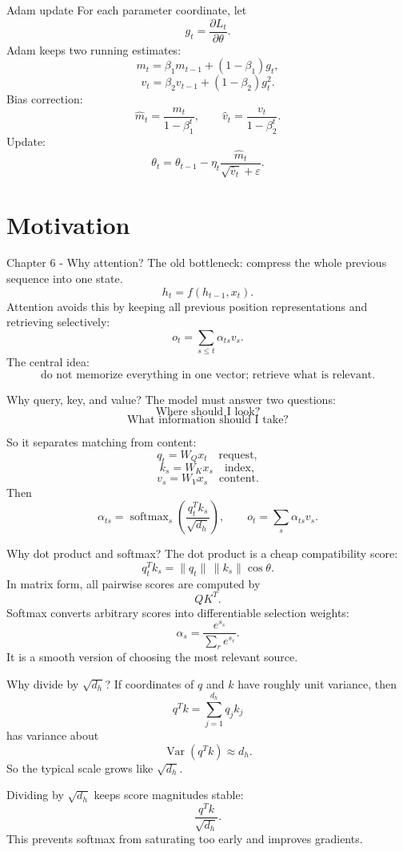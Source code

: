\documentclass[
  xcolor={svgnames,dvipsnames},
  hyperref={pagebackref,bookmarks},
  aspectratio=169,
  11pt
]{beamer}
\begin{document}
\begin{frame}{Adam update}
For each parameter coordinate, let
\[
g_t=\frac{\partial L_t}{\partial\theta}.
\]
Adam keeps two running estimates:
\[
m_t=\beta_1m_{t-1}+(1-\beta_1)g_t,
\]
\[
v_t=\beta_2v_{t-1}+(1-\beta_2)g_t^2.
\]
Bias correction:
\[
\hat m_t=\frac{m_t}{1-\beta_1^t},\qquad
\hat v_t=\frac{v_t}{1-\beta_2^t}.
\]
Update:
\[
\theta_t=\theta_{t-1}-\eta_t\frac{\hat m_t}{\sqrt{\hat v_t}+\varepsilon}.
\]
\end{frame}

\section{Motivation}
\begin{frame}{Chapter 6 - Why attention?}
The old bottleneck: compress the whole previous sequence into one state.
\[
h_t=f(h_{t-1},x_t).
\]
Attention avoids this by keeping all previous position representations and retrieving selectively:
\[
o_t=\sum_{s\le t}\alpha_{ts}v_s.
\]
The central idea:
\[
\boxed{\text{do not memorize everything in one vector; retrieve what is relevant.}}
\]
\end{frame}

\begin{frame}{Why query, key, and value?}
The model must answer two questions:
\[
\text{Where should I look?}
\]
\[
\text{What information should I take?}
\]

So it separates matching from content:
\[
q_t=W_Qx_t\quad\text{request},
\]
\[
k_s=W_Kx_s\quad\text{index},
\]
\[
v_s=W_Vx_s\quad\text{content}.
\]
Then
\[
\alpha_{ts}=\operatorname{softmax}_s\left(\frac{q_t^Tk_s}{\sqrt{d_h}}\right),
\qquad
 o_t=\sum_s\alpha_{ts}v_s.
\]
\end{frame}

\begin{frame}{Why dot product and softmax?}
The dot product is a cheap compatibility score:
\[
q_t^Tk_s=\|q_t\|\,\|k_s\|\cos\theta.
\]
In matrix form, all pairwise scores are computed by
\[
QK^T.
\]
Softmax converts arbitrary scores into differentiable selection weights:
\[
\alpha_s=\frac{e^{s_s}}{\sum_r e^{s_r}}.
\]
It is a smooth version of choosing the most relevant source.
\end{frame}

\begin{frame}{Why divide by $\sqrt{d_h}$?}
If coordinates of $q$ and $k$ have roughly unit variance, then
\[
q^Tk=\sum_{j=1}^{d_h}q_jk_j
\]
has variance about
\[
\operatorname{Var}(q^Tk)\approx d_h.
\]
So the typical scale grows like $\sqrt{d_h}$.

Dividing by $\sqrt{d_h}$ keeps score magnitudes stable:
\[
\frac{q^Tk}{\sqrt{d_h}}.
\]
This prevents softmax from saturating too early and improves gradients.
\end{frame}
\end{document}
